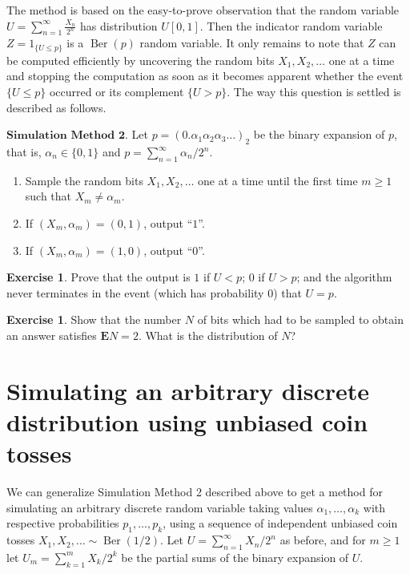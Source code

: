 \documentclass[11pt]{report}
\theoremstyle{plain}
\theoremstyle{definition}
\newtheorem{xexercise}[thm]{Exercise}
\begin{document}
The method is based on the easy-to-prove observation
that the random variable
$U=\sum_{n=1}^\infty \frac{X_n}{2^n}$ has
distribution $U[0,1]$. Then the indicator random
variable $Z = 1_{\{U\le p\}}$ is a
$\operatorname{Ber}(p)$ random variable. It only
remains to note that $Z$ can be computed efficiently
by uncovering the random bits $X_1,X_2,\ldots$ one at
a time and stopping the computation as soon as it
becomes apparent whether the event $\{U\le p\}$
occurred or its complement $\{U>p\}$. The way this
question is settled is described as follows.

$\textbf{Simulation Method 2.}$ Let
$p=(0.\alpha_1 \alpha_2 \alpha_3 \ldots )_2$ be the
binary expansion of $p$, that is,
$\alpha_n\in \{0,1\}$ and
$p=\sum_{n=1}^\infty \alpha_n/2^{n}$.

\begin{enumerate}[label=\arabic*.]
\item Sample the random bits $X_1,X_2,\ldots$ one at a time
until the first time $m\ge1$ such that
$X_m \neq \alpha_m$.

\item If $(X_m,\alpha_m)=(0,1)$, output ``$1$''.

\item If $(X_m,\alpha_m)=(1,0)$, output ``$0$''.
\end{enumerate}

\begin{xexercise}
Prove that the output is $1$ if $U< p$; $0$ if $U>p$;
and the algorithm never terminates in the event (which
has probability 0) that $U=p$.
\end{xexercise}

\begin{xexercise}
Show that the number $N$ of bits which had to be
sampled to obtain an answer satisfies
$\mathbf{E} N = 2$. What is the distribution of $N$?
\end{xexercise}

\section{Simulating an arbitrary discrete distribution using unbiased coin tosses}
We can generalize Simulation Method 2 described above
to get a method for simulating an arbitrary discrete
random variable taking values
$\alpha_1,\ldots,\alpha_k$ with respective
probabilities $p_1,\ldots,p_k$, using a sequence of
independent unbiased coin tosses
$X_1,X_2,\ldots \sim \operatorname{Ber}(1/2)$. Let
$U=\sum_{n=1}^\infty X_n/2^n$ as before, and for
$m\ge 1$ let $U_m = \sum_{k=1}^m X_k/2^k$ be the
partial sums of the binary expansion of $U$.
\end{document}
